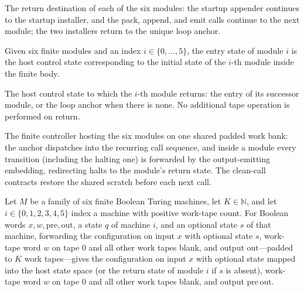\begin{definition}
\label{Complexity.satHostNext}
\leanok
The return destination of each of the six modules: the startup appender
continues to the startup installer, and the pack, append, and emit calls
continue to the next module; the two installers return to the unique loop
anchor.
\end{definition}

\begin{definition}
\label{Complexity.satHostEntry}
\leanok
{}
Given six finite modules and an index $i \in \{0, \dots, 5\}$, the entry state of
module $i$ is the host control state corresponding to the initial state of the
$i$-th module inside the finite body.
\end{definition}

\begin{definition}
\label{Complexity.satHostRet}
\leanok
{}
The host control state to which the $i$-th module returns: the entry of its
successor module, or the loop anchor when there is none. No additional tape
operation is performed on return.
\end{definition}

\begin{definition}
\label{Complexity.satHostTM}
\leanok
{}
The finite controller hosting the six modules on one shared padded work bank:
the anchor dispatches into the recurring call sequence, and inside a module
every transition (including the halting one) is forwarded by the
output-emitting embedding, redirecting halts to the module's return state. The
clean-call contracts restore the shared scratch before each next call.
\end{definition}

\begin{lemma}
\label{Complexity.satHost_seam}
\leanok
{}
Let $M$ be a family of six finite Boolean Turing machines, let $K\in\mathbb{N}$, and let
$i\in\{0,1,2,3,4,5\}$ index a machine with positive work-tape count. For Boolean words
$x,w,\mathrm{pre},\mathrm{out}$, a state $q$ of machine $i$, and an optional state $s$
of that machine, forwarding the configuration on input $x$ with optional state $s$,
work-tape word $w$ on tape $0$ and all other work tapes blank, and output
$\mathrm{out}$—padded to $K$ work tapes—gives the configuration on input $x$ with
optional state mapped into the host state space (or the return state of module $i$ if
$s$ is absent), work-tape word $w$ on tape $0$ and all other work tapes blank, and
output $\mathrm{pre}\,\mathrm{out}$.
\end{lemma}


